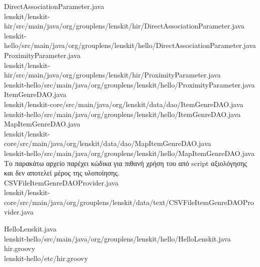 \begin{scriptsize}
{\en DirectAssociationParameter.java\\
lenskit/lenskit-hir/src/main/java/org/grouplens/lenskit/hir/DirectAssociationParameter.java\\
lenskit-hello/src/main/java/org/grouplens/lenskit/hello/DirectAssociationParameter.java }
{\en ProximityParameter.java\\
lenskit/lenskit-hir/src/main/java/org/grouplens/lenskit/hir/ProximityParameter.java\\
lenskit-hello/src/main/java/org/grouplens/lenskit/hello/ProximityParameter.java
 }
{\en ItemGenreDAO.java\\
lenskit/lenskit-core/src/main/java/org/lenskit/data/dao/ItemGenreDAO.java\\
lenskit-hello/src/main/java/org/grouplens/lenskit/hello/ItemGenreDAO.java
}
\clearpage
{\en MapItemGenreDAO.java\\
lenskit/lenskit-core/src/main/java/org/lenskit/data/dao/MapItemGenreDAO.java\\
lenskit-hello/src/main/java/org/grouplens/lenskit/hello/MapItemGenreDAO.java
}
Το παρακάτω αρχείο παρέχει κώδικα για πιθανή χρήση του από {\en script} αξιολόγησης και δεν αποτελεί μέρος της υλοποίησης. \\
{\en CSVFileItemGenreDAOProvider.java\\
lenskit/lenskit-core/src/main/java/org/grouplens/lenskit/data/text/CSVFileItemGenreDAOProvider.java
}
\end{scriptsize}
\begin{scriptsize}
{\en HelloLenskit.java\\
lenskit-hello/src/main/java/org/grouplens/lenskit/hello/HelloLenskit.java
}
{\en hir.groovy\\
lenskit-hello/etc/hir.groovy
}
\end{scriptsize}
\clearpage
